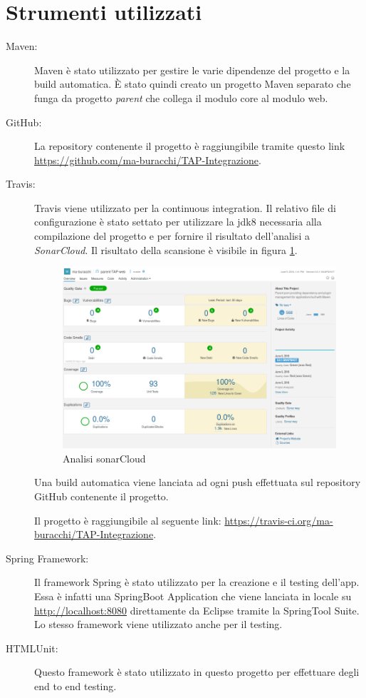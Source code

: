 \documentclass[12pt]{article}
\begin{document}
\section{Strumenti utilizzati}
	\begin{description}
		\item[Maven:] Maven è stato utilizzato per gestire le varie dipendenze del progetto e la build automatica. \`{E} stato quindi creato un progetto Maven separato che funga da progetto \emph{parent} che collega il modulo core al modulo web.
		
		\item[GitHub:] La repository contenente il progetto è raggiungibile tramite questo link \url{https://github.com/ma-buracchi/TAP-Integrazione}.
		
		\item[Travis:] Travis viene utilizzato per la continuous integration. Il relativo file di configurazione è stato settato per utilizzare la jdk8 necessaria alla compilazione del progetto e per fornire il risultato dell'analisi a \emph{SonarCloud}. Il risultato della scansione è visibile in figura \ref{fig:sonar}.
		
		\begin{figure}
			\begin{center}
				\includegraphics[scale=.3]{img/sonarCloud}
				\caption{Analisi sonarCloud}
				\label{fig:sonar}
			\end{center}
		\end{figure}
		
		Una build automatica viene lanciata ad ogni push effettuata sul repository GitHub contenente il progetto.
		
		Il progetto è raggiungibile al seguente link: \url{https://travis-ci.org/ma-buracchi/TAP-Integrazione}.
		
		\item[Spring Framework:] Il framework Spring è stato utilizzato per la creazione e il testing dell'app. Essa è infatti una SpringBoot Application che viene lanciata in locale su \url{http://localhost:8080} direttamente da Eclipse tramite la SpringTool Suite. Lo stesso framework viene utilizzato anche per il testing.
		
		\item[HTMLUnit:] Questo framework è stato utilizzato in questo progetto per effettuare degli end to end testing.
	\end{description}
	
\end{document}
